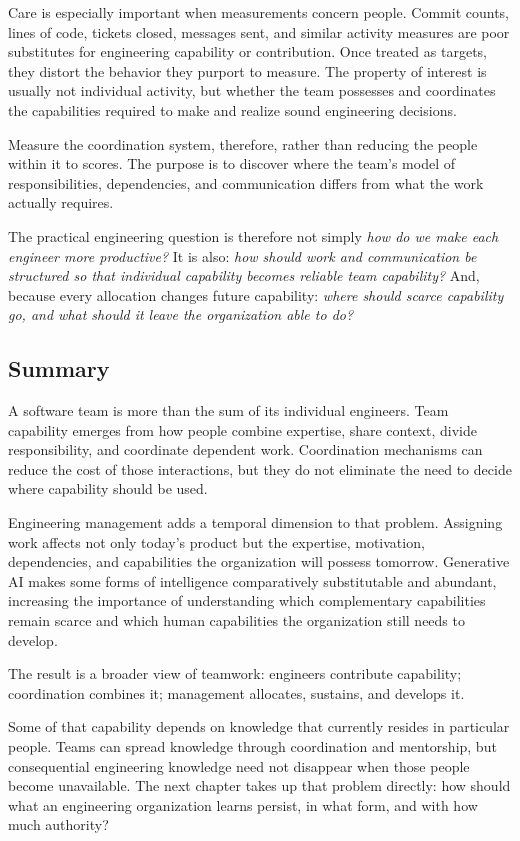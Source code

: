 Care is especially important when measurements concern people. Commit counts, lines of code, tickets
closed, messages sent, and similar activity measures are poor substitutes for engineering capability
or contribution. Once treated as targets, they distort the behavior they purport to measure. The
property of interest is usually not individual activity, but whether the team possesses and
coordinates the capabilities required to make and realize sound engineering decisions.

Measure the coordination system, therefore, rather than reducing the people within it to scores. The
purpose is to discover where the team's model of responsibilities, dependencies, and communication
differs from what the work actually requires.

The practical engineering question is therefore not simply \emph{how do we make each engineer more
productive?} It is also: \emph{how should work and communication be structured so that individual
capability becomes reliable team capability?} And, because every allocation changes future
capability: \emph{where should scarce capability go, and what should it leave the organization able to
do?}

\subsection{Summary}\label{summary}

A software team is more than the sum of its individual engineers. Team capability emerges from how
people combine expertise, share context, divide responsibility, and coordinate dependent work.
Coordination mechanisms can reduce the cost of those interactions, but they do not eliminate the
need to decide where capability should be used.

Engineering management adds a temporal dimension to that problem. Assigning work affects not only
today's product but the expertise, motivation, dependencies, and capabilities the organization will
possess tomorrow. Generative AI makes some forms of intelligence comparatively substitutable and
abundant, increasing the importance of understanding which complementary capabilities remain scarce
and which human capabilities the organization still needs to develop.

The result is a broader view of teamwork: engineers contribute capability; coordination combines
it; management allocates, sustains, and develops it.

Some of that capability depends on knowledge that currently resides in particular people. Teams can
spread knowledge through coordination and mentorship, but consequential engineering knowledge need
not disappear when those people become unavailable. The next chapter takes up that problem directly:
how should what an engineering organization learns persist, in what form, and with how much
authority?

